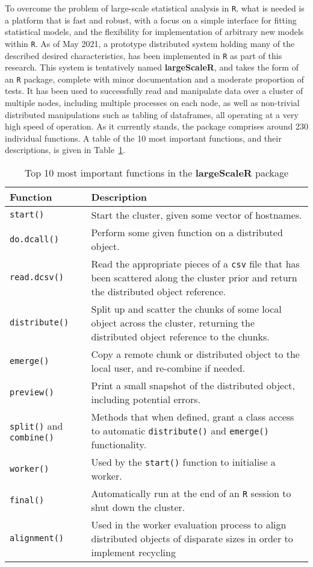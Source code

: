 To overcome the problem of large-scale statistical analysis in \texttt{R}, what is needed is a platform that is fast and robust, with a focus on a simple interface for fitting statistical models, and the flexibility for implementation of arbitrary new models within \texttt{R}.
As of May 2021, a prototype distributed system holding many of the described desired characteristics, has been implemented in \texttt{R} as part of this research.
This system is tentatively named \textbf{largeScaleR}, and takes the form of an \texttt{R} package, complete with minor documentation and a moderate proportion of tests.
It has been used to successfully read and manipulate data over a cluster of multiple nodes, including multiple processes on each node, as well as non-trivial distributed manipulations such as tabling of dataframes, all operating at a very high speed of operation.
As it currently stands, the package comprises around 230 individual functions.
A table of the 10 most important functions, and their descriptions, is given in Table~\ref{tab:functions}.

\begin{table}
	\centering
	\begin{tabular}{lp{}}
		\toprule
		Function & Description\\
		\midrule
		\texttt{start()} & Start the cluster, given some vector of hostnames. \\
		\texttt{do.dcall()} & Perform some given function on a distributed object. \\
		\texttt{read.dcsv()} & Read the appropriate pieces of a \texttt{csv} file that has been scattered along the cluster prior and return the distributed object reference. \\
		\texttt{distribute()} & Split up and scatter the chunks of some local object across the cluster, returning the distributed object reference to the chunks. \\
		\texttt{emerge()} & Copy a remote chunk or distributed object to the local user, and re-combine if needed. \\
		\texttt{preview()} & Print a small snapshot of the distributed object, including potential errors. \\
		\texttt{split()} and  \texttt{combine()} & Methods that when defined, grant a class access to automatic \texttt{distribute()} and \texttt{emerge()} functionality.\\
		\texttt{worker()} & Used by the \texttt{start()} function to initialise a worker. \\
		\texttt{final()} & Automatically run at the end of an \texttt{R} session to shut down the cluster. \\
		\texttt{alignment()} & Used in the worker evaluation process to align distributed objects of disparate sizes in order to implement recycling \\
		\bottomrule
	\end{tabular}
	\caption{\label{tab:functions}Top 10 most important functions in the \textbf{largeScaleR} package}
\end{table}

